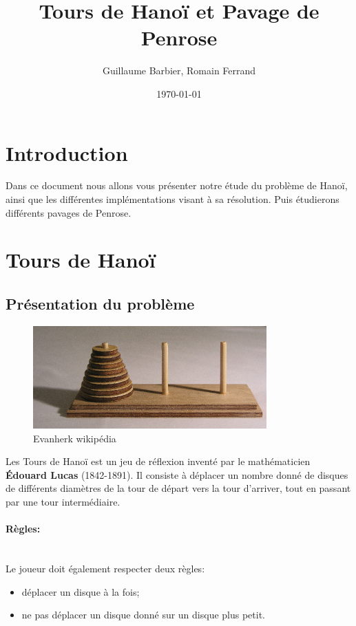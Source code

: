\documentclass[a4paper,11pt]{article}
\begin{document}
\begin{titlepage}
  \title{Tours de Hanoï et Pavage de Penrose}
  \author{Guillaume Barbier, Romain Ferrand}
  \date{\today}

  \maketitle

  \begin{abstract}
    
  \end{abstract}
\end{titlepage}

\section*{Introduction}
Dans ce document nous allons vous présenter notre étude du problème de Hanoï,
ainsi que les différentes implémentations visant à sa résolution.
Puis étudierons différents pavages de Penrose.

\section{Tours de Hanoï}
\label{chap:hanoi}

\subsection{Présentation du problème}
\label{sec:prezHanoi}
\begin{figure}
  \centering
  \includegraphics[width=0.8\textwidth]{Tower_of_Hanoi.jpeg}
  \caption{Evanherk wikipédia}
  \label{fig:hanoi}
\end{figure}

Les Tours de Hanoï est un jeu de réflexion inventé par le mathématicien \textbf{Édouard Lucas} (1842-1891).
Il consiste à déplacer un nombre donné de disques de différents diamètres de la tour de départ vers la tour d'arriver, tout en passant par une tour intermédiaire.
\paragraph{Règles:}\mbox{}\\
Le joueur doit également respecter deux règles:
\begin{itemize}
\item déplacer un disque à la fois;
\item ne pas déplacer un disque donné sur un disque plus petit.
\end{itemize}
\end{document}
